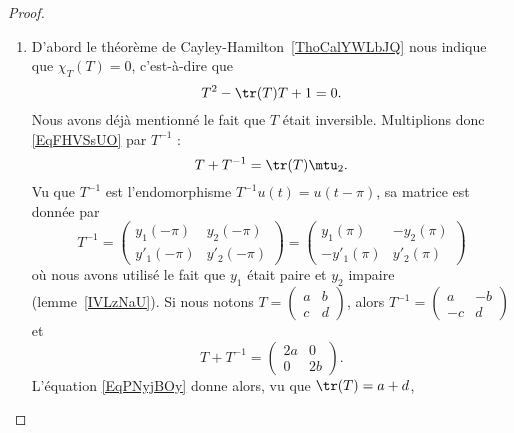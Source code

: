 \begin{proof}
\begin{enumerate}
        \item

            D'abord le théorème de Cayley-Hamilton~\ref{ThoCalYWLbJQ} nous indique que \( \chi_T(T)=0\), c'est-à-dire que
            \begin{equation}    \label{EqFHVSsUO}
                T^2-\tr(T)T+1=0.
            \end{equation}
            Nous avons déjà mentionné le fait que \( T\) était inversible. Multiplions donc \eqref{EqFHVSsUO} par \( T^{-1}\) :
            \begin{equation}    \label{EqPNyjBOy}
                T+T^{-1}=\tr(T)\mtu_2.
            \end{equation}
            Vu que \( T^{-1}\) est l'endomorphisme \( T^{-1}u(t)=u(t-\pi)\), sa matrice est donnée par
            \begin{equation}
                T^{-1}=\begin{pmatrix}
                    y_1(-\pi)    &   y_2(-\pi)    \\
                    y'_1(-\pi)    &   y'_2(-\pi)
                \end{pmatrix}=\begin{pmatrix}
                    y_1(\pi)    &   -y_2(\pi)    \\
                    -y'_1(\pi)    &   y'_2(\pi)
                \end{pmatrix}
            \end{equation}
            où nous avons utilisé le fait que \( y_1\) était paire et \( y_2\) impaire (lemme~\ref{IVLzNaU}). Si nous notons \( T=\begin{pmatrix}
                a    &   b    \\
                c    &   d
            \end{pmatrix}\), alors \( T^{-1}=\begin{pmatrix}
                a    &   -b    \\
                -c    &   d
            \end{pmatrix}\) et
            \begin{equation}
                T+T^{-1}=\begin{pmatrix}
                    2a    &     0  \\
                       0 &   2b
                \end{pmatrix}.
            \end{equation}
            L'équation \eqref{EqPNyjBOy} donne alors, vu que \( \tr(T)=a+d\),

\end{enumerate}
\end{proof}
